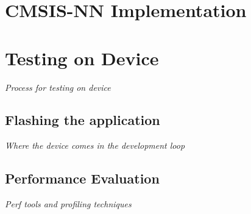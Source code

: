 \section{CMSIS-NN Implementation}
\textit{}

\section{Testing on Device}
\textit{Process for testing on device}

\subsection{Flashing the application}
\textit{Where the device comes in the development loop}

\subsection{Performance Evaluation}
\textit{Perf tools and profiling techniques}
